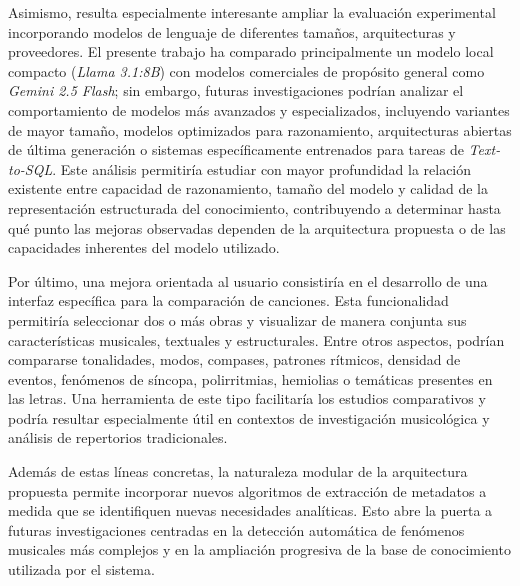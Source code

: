 Asimismo, resulta especialmente interesante ampliar la evaluación experimental incorporando modelos de lenguaje de diferentes tamaños, arquitecturas y proveedores. El presente trabajo ha comparado principalmente un modelo local compacto (\textit{Llama 3.1:8B}) con modelos comerciales de propósito general como \textit{Gemini 2.5 Flash}; sin embargo, futuras investigaciones podrían analizar el comportamiento de modelos más avanzados y especializados, incluyendo variantes de mayor tamaño, modelos optimizados para razonamiento, arquitecturas abiertas de última generación o sistemas específicamente entrenados para tareas de \textit{Text-to-SQL}. Este análisis permitiría estudiar con mayor profundidad la relación existente entre capacidad de razonamiento, tamaño del modelo y calidad de la representación estructurada del conocimiento, contribuyendo a determinar hasta qué punto las mejoras observadas dependen de la arquitectura propuesta o de las capacidades inherentes del modelo utilizado.

Por último, una mejora orientada al usuario consistiría en el desarrollo de una interfaz específica para la comparación de canciones. Esta funcionalidad permitiría seleccionar dos o más obras y visualizar de manera conjunta sus características musicales, textuales y estructurales. Entre otros aspectos, podrían compararse tonalidades, modos, compases, patrones rítmicos, densidad de eventos, fenómenos de síncopa, polirritmias, hemiolias o temáticas presentes en las letras. Una herramienta de este tipo facilitaría los estudios comparativos y podría resultar especialmente útil en contextos de investigación musicológica y análisis de repertorios tradicionales.

Además de estas líneas concretas, la naturaleza modular de la arquitectura propuesta permite incorporar nuevos algoritmos de extracción de metadatos a medida que se identifiquen nuevas necesidades analíticas. Esto abre la puerta a futuras investigaciones centradas en la detección automática de fenómenos musicales más complejos y en la ampliación progresiva de la base de conocimiento utilizada por el sistema.
